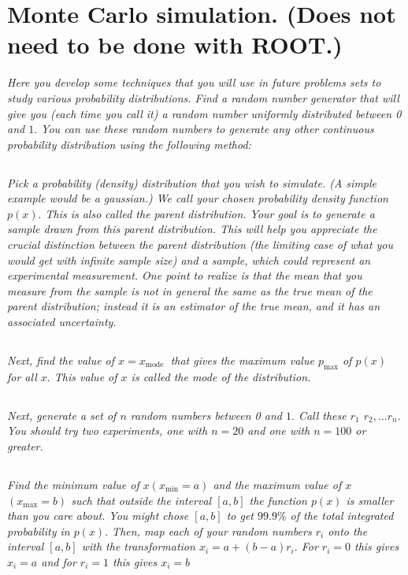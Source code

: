 \documentclass{article}
\begin{document}
\section{Monte Carlo simulation. (Does not need to be done with ROOT.)}
\textit{ Here you develop some techniques that you will use in future problems sets to study various probability distributions. Find a random number generator that will give you (each time you call it) a random number uniformly distributed between 0 and $1 .$ You can use these random numbers to generate any other continuous probability distribution using the following method:}



\subsection{}
\textit{Pick a probability (density) distribution that you wish to simulate. (A simple example would be a gaussian.) We call your chosen probability density function $p(x) .$ This is also called the parent distribution. Your goal is to generate a sample drawn from this parent distribution. This will help you appreciate the crucial distinction between the parent distribution (the limiting case of what you would get with infinite sample size) and a sample, which could represent an experimental measurement. One point to realize is that the mean that you measure from the sample is not in general the same as the true mean of the parent distribution; instead it is an estimator of the true mean, and it has an associated uncertainty.}


\subsection{}
\textit{Next, find the value of $x=x_{\text {mode }}$ that gives the maximum value $p_{\max }$ of $p(x)$ for all $x .$ This value of $x$ is called the mode of the distribution.}


\subsection{}
\textit{Next, generate a set of $n$ random numbers between 0 and $1 .$ Call these $r_{1}$ $r_{2}, \ldots r_{n} .$ You should try two experiments, one with $n=20$ and one with $n=100$ or greater.}



\subsection{}
\textit{Find the minimum value of $x\left(x_{\min }=a\right)$ and the maximum value of $x$ $\left(x_{\max }=b\right)$ such that outside the interval $[a, b]$ the function $p(x)$ is smaller than you care about. You might chose $[a, b]$ to get $99.9 \%$ of the total integrated probability in $p(x) .$ Then, map each of your random numbers $r_{i}$ onto the interval $[a, b]$ with the transformation $x_{i}=a+(b-a) r_{i} .$ For $r_{i}=0$ this gives $x_{i}=a$ and for $r_{i}=1$ this gives $x_{i}=b$}
\end{document}
